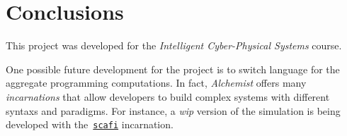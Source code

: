 \section{Conclusions}
This project was developed for the \textit{Intelligent Cyber-Physical Systems} course.

One possible future development for the project is to switch language for the aggregate programming computations.
In fact, \textit{Alchemist} offers many \textit{incarnations} that allow developers to build complex systems with different syntaxs and paradigms.
For instance, a \textit{wip} version of the simulation is being developed with the~\href{https://scafi.github.io/}{\texttt{scafi}} incarnation.
